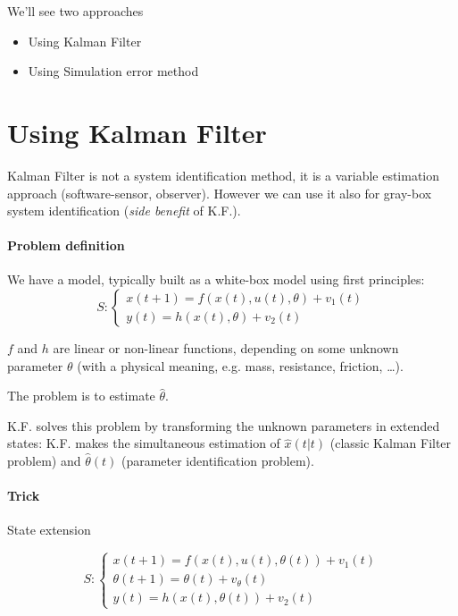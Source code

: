 

We'll see two approaches
\begin{itemize}
    \item Using Kalman Filter
    \item Using Simulation error method
\end{itemize}

\section{Using Kalman Filter}
Kalman Filter is not a system identification method, it is a variable estimation approach (software-sensor, observer).
However we can use it also for gray-box system identification (\emph{side benefit} of K.F.).

\paragraph{Problem definition} We have a model, typically built as a white-box model using first principles:
\[
    S: \begin{cases}
        x(t+1) = f(x(t), u(t), \theta) + v_1(t) \\
        y(t) = h(x(t), \theta) + v_2(t)
    \end{cases}
\]

$f$ and $h$ are linear or non-linear functions, depending on some unknown parameter $\theta$ (with a physical meaning, e.g. mass, resistance, friction, \dots).

The problem is to estimate $\hat{\theta}$.

K.F. solves this problem by transforming the unknown parameters in extended states: K.F. makes the simultaneous estimation of $\hat{x}(t|t)$ (classic Kalman Filter problem) and $\hat{\theta}(t)$ (parameter identification problem).

\paragraph{Trick} State extension

\[
    S: \begin{cases}
        x(t+1) = f(x(t), u(t), \theta(t)) + v_1(t) \\
        \theta(t+1) = \theta(t) + v_\theta(t) \\
        y(t) = h(x(t), \theta(t)) + v_2(t)
    \end{cases}
\]

